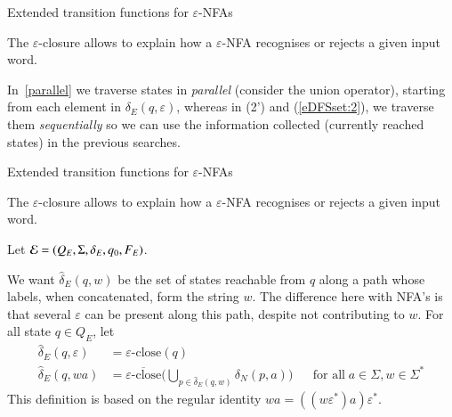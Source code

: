 \documentclass[compress,dvips,xcolor={dvipsnames},t]{beamer}
\newcommand\eNFA{\(\varepsilon\)-NFA\xspace}
\newcommand\eClose{\varepsilon\text{-close}}
\newcommand\eCloseSet{\overline{\eClose}}
\begin{document}
%
\begin{frame}{Extended transition functions for {\eNFA}s}

The \(\varepsilon\)-closure allows to explain how a \eNFA recognises or
rejects a given input word.

\bigskip

In~\eqref{parallel} we traverse states in \emph{parallel} (consider
the union operator), starting from each element in \(\delta_E (q,
\varepsilon)\), whereas in (2') and (\ref{eDFSset:2}), we traverse them
\emph{sequentially} so we can use the information collected (currently
reached states) in the previous searches.

\end{frame}

%
\begin{frame}{Extended transition functions for {\eNFA}s}

The \(\varepsilon\)-closure allows to explain how a \eNFA recognises or
rejects a given input word.

\bigskip

Let \({\cal E} = (Q_E, \Sigma, \delta_E, q_0, F_E)\).

\bigskip

We want \(\hat{\delta}_E (q, w)\) be the set of states reachable from
\(q\) along a path whose labels, when concatenated, form the string
\(w\). The difference here with NFA's is that several \(\varepsilon\) can
be present along this path, despite not contributing to \(w\).
For all state \(q \in Q_E\), let
\begin{align*}
   \hat{\delta}_E (q, \varepsilon)
&= \eClose (q)\\
   \hat{\delta}_E (q, wa)
&= \eCloseSet \Biggl(\bigcup_{p \in \hat{\delta}_E (q, w)}{\delta_N (p,
     a)}\Biggr)
&& \text{for all} \; a \in \Sigma, w \in \Sigma^{*}
\end{align*}
This definition is based on the regular identity \(wa =
((w\varepsilon^{*})a)\varepsilon^{*}\).

\end{frame}
\end{document}
